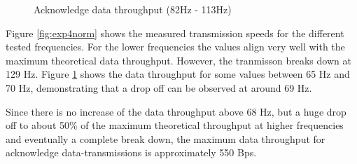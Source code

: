\begin{description}
\begin{figure}[H]
		\caption{Acknowledge data throughput (82Hz - 113Hz)}\label{fig:exp4between}
	\end{figure}
	
	Figure \ref{fig:exp4norm} shows the measured transmission speeds for the different tested frequencies. For the lower frequencies the values align very well with the maximum theoretical data throughput. However, the tranmisson breaks down at 129 Hz. Figure \ref{fig:exp4between} shows the data throughput for some values between 65 Hz and 70 Hz, demonstrating that a drop off can be observed at around 69 Hz. 
	
	Since there is no increase of the data throughput above 68 Hz, but a huge drop off to about 50\% of the maximum theoretical throughput at higher frequencies and eventually a complete break down, the maximum data throughput for acknowledge data-transmissions is approximately 550 Bps.
\end{description}
\newpage

